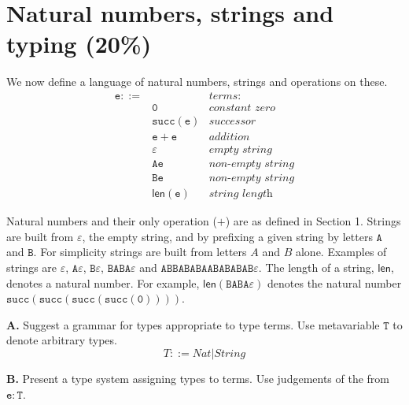 \documentclass[a4paper]{article}
\begin{document}
\section{Natural numbers, strings and typing (20\%)}

We now define a language of natural numbers, strings and operations on these.
%
\begin{align*}
  \mathtt e ::= & & \textit{terms:}\\
  & \mathtt 0 & \textit{constant zero}\\
  & \mathtt{succ(e)} & \textit{successor}\\
  & \mathtt e + \mathtt e & \textit{addition}\\
  & \varepsilon & \textit{empty string}\\
  & \mathtt{Ae} & \textit{non-empty string}\\
  & \mathtt{Be} & \textit{non-empty string}\\
  & \mathsf{len}(\mathtt e) & \textit{string length}
\end{align*}

Natural numbers and their only operation ($\mathsf{+}$) are as defined in
Section 1. Strings are built from $\varepsilon$, the empty string, and by prefixing
a given string by letters $\mathtt A$ and $\mathtt B$. For simplicity strings
are built from letters $A$ and $B$ alone. Examples of strings are $\varepsilon$,
$\mathtt A\varepsilon$, $\mathtt B\varepsilon$, $\mathtt{BABA}\varepsilon$ and
$\mathtt{ABBABABAABABABAB}\varepsilon$. The length of a string, $\mathsf{len}$,
denotes a natural number. For example, $\mathsf{len}(\mathtt{BABA}\varepsilon)$
denotes the natural number $\mathtt{succ(succ(succ(succ(0))))}$.

\textbf{A.} Suggest a grammar for types appropriate to type terms. Use
metavariable $\mathtt T$ to denote arbitrary types.
\[ T ::= Nat | String \]

\textbf{B.} Present a type system assigning types to terms. Use judgements of
the from $\mathtt e : \mathtt T$.

\end{document}
